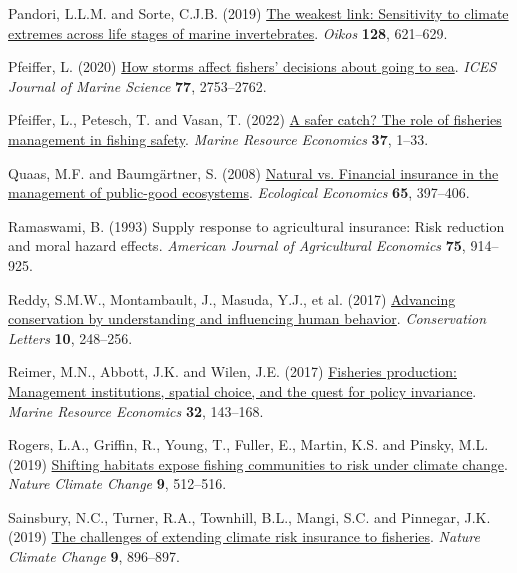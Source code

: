 \documentclass[
  letterpaper,
  DIV=11,
  numbers=noendperiod]{scrartcl}
\newlength{\cslhangindent}
\newlength{\cslentryspacingunit} %
\newenvironment{CSLReferences}[2] %
 {%
  \setlength{\parindent}{0pt}
  \ifodd #1
  \let\oldpar\par
  \def\par{\hangindent=\cslhangindent\oldpar}
  \fi
  \setlength{\parskip}{#2\cslentryspacingunit}
 }%
 {}
\theoremstyle{plain}
\theoremstyle{plain}
\theoremstyle{remark}
\begin{document}
\begin{CSLReferences}{1}{0}
\leavevmode{}%
Pandori, L.L.M. and Sorte, C.J.B. (2019)
\href{https://doi.org/10.1111/oik.05886}{The weakest link: Sensitivity
to climate extremes across life stages of marine invertebrates}.
\emph{Oikos} \textbf{128}, 621--629.

\leavevmode{}%
Pfeiffer, L. (2020) \href{https://doi.org/10.1093/icesjms/fsaa145}{How
storms affect fishers' decisions about going to sea}. \emph{ICES Journal
of Marine Science} \textbf{77}, 2753--2762.

\leavevmode{}%
Pfeiffer, L., Petesch, T. and Vasan, T. (2022)
\href{https://doi.org/10.1086/716856}{A safer catch? The role of
fisheries management in fishing safety}. \emph{Marine Resource
Economics} \textbf{37}, 1--33.

\leavevmode{}%
Quaas, M.F. and Baumgärtner, S. (2008)
\href{https://doi.org/10.1016/j.ecolecon.2007.07.004}{Natural vs.
Financial insurance in the management of public-good ecosystems}.
\emph{Ecological Economics} \textbf{65}, 397--406.

\leavevmode{}%
Ramaswami, B. (1993) Supply response to agricultural insurance: Risk
reduction and moral hazard effects. \emph{American Journal of
Agricultural Economics} \textbf{75}, 914--925.

\leavevmode{}%
Reddy, S.M.W., Montambault, J., Masuda, Y.J., et al. (2017)
\href{https://doi.org/10.1111/conl.12252}{Advancing conservation by
understanding and influencing human behavior}. \emph{Conservation
Letters} \textbf{10}, 248--256.

\leavevmode{}%
Reimer, M.N., Abbott, J.K. and Wilen, J.E. (2017)
\href{https://doi.org/10.1086/690678}{Fisheries production: Management
institutions, spatial choice, and the quest for policy invariance}.
\emph{Marine Resource Economics} \textbf{32}, 143--168.

\leavevmode{}%
Rogers, L.A., Griffin, R., Young, T., Fuller, E., Martin, K.S. and
Pinsky, M.L. (2019)
\href{https://doi.org/10.1038/s41558-019-0503-z}{Shifting habitats
expose fishing communities to risk under climate change}. \emph{Nature
Climate Change} \textbf{9}, 512--516.

\leavevmode{}%
Sainsbury, N.C., Turner, R.A., Townhill, B.L., Mangi, S.C. and Pinnegar,
J.K. (2019) \href{https://doi.org/10.1038/s41558-019-0645-z}{The
challenges of extending climate risk insurance to fisheries}.
\emph{Nature Climate Change} \textbf{9}, 896--897.


\end{CSLReferences}
\end{document}
